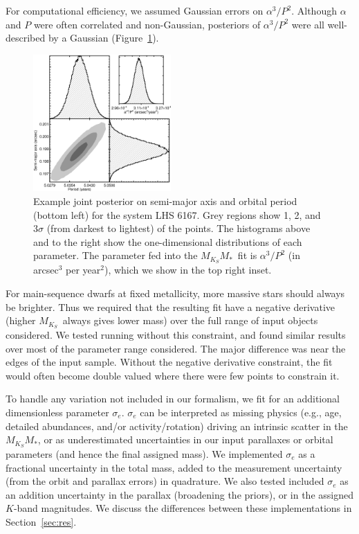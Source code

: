 \documentclass[twocolumn]{aastex62}
\newcommand{\mks}{$M_{K_S}$}
\newcommand{\mmk}{$M_{K_S}$\textendash$M_*$}
\begin{document}
For computational efficiency, we assumed Gaussian errors on $\alpha^3/P^2$. Although $\alpha$ and $P$ were often correlated and non-Gaussian, posteriors of $\alpha^3/P^2$ were all well-described by a Gaussian (Figure~\ref{fig:correlated}). 

\begin{figure}[htb]
\begin{center}
\includegraphics[width=0.47\textwidth]{LHS6167_corner.eps}
\caption{Example joint posterior on semi-major axis and orbital period (bottom left) for the system LHS 6167. Grey regions show 1, 2, and 3$\sigma$ (from darkest to lightest) of the points. The histograms above and to the right show the one-dimensional distributions of each parameter. The parameter fed into the \mmk\ fit is $\alpha^3/P^2$ (in arcsec$^3$ per year$^2$), which we show in the top right inset. }
\label{fig:correlated}
\end{center}
\end{figure}

For main-sequence dwarfs at fixed metallicity, more massive stars should always be brighter. Thus we required that the resulting fit have a negative derivative (higher \mks\ always gives lower mass) over the full range of input objects considered. We tested running without this constraint, and found similar results over most of the parameter range considered. The major difference was near the edges of the input sample. Without the negative derivative constraint, the fit would often become double valued where there were few points to constrain it.

To handle any variation not included in our formalism, we fit for an additional dimensionless parameter $\sigma_e$. $\sigma_e$ can be interpreted as missing physics (e.g., age, detailed abundances, and/or activity/rotation) driving an intrinsic scatter in the \mmk, or as underestimated uncertainties in our input parallaxes or orbital parameters (and hence the final assigned mass). We implemented $\sigma_e$ as a fractional uncertainty in the total mass, added to the measurement uncertainty (from the orbit and parallax errors) in quadrature. We also tested included $\sigma_e$ as an addition uncertainty in the parallax (broadening the priors), or in the assigned $K$-band magnitudes. We discuss the differences between these implementations in Section~\ref{sec:res}.
\end{document}
